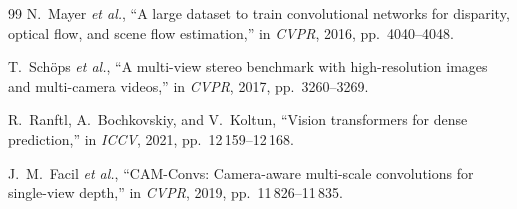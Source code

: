 \documentclass[journal,twocolumn]{IEEEtran}
\begin{document}
\begin{thebibliography}{99}
N.\ Mayer \textit{et al.}, ``A large dataset to train convolutional networks for disparity, optical flow, and scene flow estimation,'' in \textit{CVPR}, 2016, pp.~4040--4048.

T.\ Sch\"ops \textit{et al.}, ``A multi-view stereo benchmark with high-resolution images and multi-camera videos,'' in \textit{CVPR}, 2017, pp.~3260--3269.

R.\ Ranftl, A.\ Bochkovskiy, and V.\ Koltun, ``Vision transformers for dense prediction,'' in \textit{ICCV}, 2021, pp.~12\,159--12\,168.

J.~M.\ Facil \textit{et al.}, ``CAM-Convs: Camera-aware multi-scale convolutions for single-view depth,'' in \textit{CVPR}, 2019, pp.~11\,826--11\,835.

\end{thebibliography}
\end{document}
